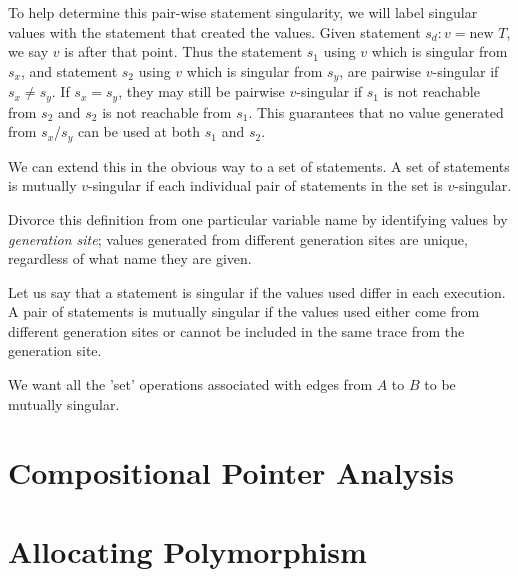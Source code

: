 \documentclass[11pt,notitlepage]{article}
\begin{document}
To help determine this pair-wise statement singularity, we will label
singular values with the statement that created the values.  Given
statement $s_d : v = \text{new }T$, we say $v$ is  after that point.  Thus the statement $s_1$ using $v$
which is singular from $s_x$, and statement $s_2$ using $v$ which is
singular from $s_y$, are pairwise $v$-singular if $s_x \neq s_y$.
If $s_x = s_y$, they may still be pairwise $v$-singular if $s_1$ is
not reachable from $s_2$ and $s_2$ is not reachable from $s_1$.  This
guarantees that no value generated from $s_x$/$s_y$ can be used at
both $s_1$ and $s_2$.

We can extend this in the obvious way to a set of statements.  A
set of statements is mutually $v$-singular if each individual pair of
statements in the set is $v$-singular.

Divorce this definition from one particular variable name by
identifying values by \textit{generation site}; values generated from
different generation sites are unique, regardless of what name they
are given.

Let us say that a statement is singular if the values used differ in
each execution.  A pair of statements is mutually singular if the
values used either come from different generation sites or cannot be
included in the same trace from the generation site.

We want all the 'set' operations associated with edges from $A$ to $B$
to be mutually singular.

\section{Compositional Pointer Analysis}

\section{Allocating Polymorphism}

%
\end{document}
